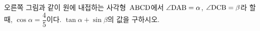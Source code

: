 \noindent\begin{minipage}[t]{0.58\linewidth}\vspace{0pt}\raggedright 오른쪽 그림과 같이 원에 내접하는 사각형~$\mathrm{ABCD}$에서 $\angle\mathrm{DAB}=\alpha$, $\angle\mathrm{DCB}=\beta$라 할 때, $\cos\alpha=\dfrac{4}{5}$이다. $\tan\alpha+\sin\beta$의 값을 구하시오.\end{minipage}\hfill\begin{minipage}[t]{0.4\linewidth}\vspace{0pt}\centering \resizebox{\ifdim\width>\linewidth\linewidth\else\width\fi}{!}{}\end{minipage}\par
